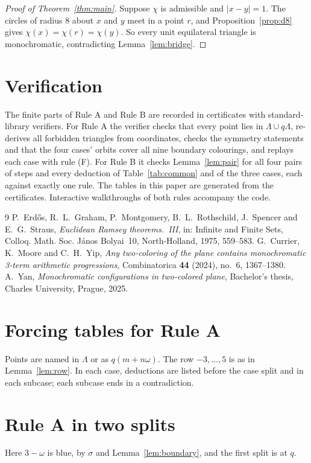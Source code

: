 \documentclass[11pt]{amsart}
\theoremstyle{definition}\newtheorem{definition}[theorem]{Definition}
\theoremstyle{remark}\newtheorem{remark}[theorem]{Remark}
\begin{document}
\begin{proof}[Proof of Theorem~\ref{thm:main}]
Suppose $\chi$ is admissible and $|x-y|=1$. The circles of radius $8$ about $x$ and $y$ meet in a point $r$, and
Proposition~\ref{prop:d8} gives $\chi(x)=\chi(r)=\chi(y)$. So every unit equilateral triangle is monochromatic,
contradicting Lemma~\ref{lem:bridge}.
\end{proof}

\section{Verification}
The finite parts of Rule A and Rule B are recorded in certificates with standard-library verifiers. For Rule A the
verifier checks that every point lies in $\Lambda\cup q\Lambda$, re-derives all forbidden triangles from coordinates,
checks the symmetry statements and that the four cases' orbits cover all nine boundary colourings, and replays each
case with rule (F). For Rule B it checks Lemma~\ref{lem:pair} for all four pairs of steps and every deduction of
Table~\ref{tab:common} and of the three cases, each against exactly one rule. The tables in this
paper are generated from the certificates. Interactive walkthroughs of both rules accompany the code.

\begin{thebibliography}{9}
 P.~Erd\H{o}s, R.~L.~Graham, P.~Montgomery, B.~L.~Rothschild, J.~Spencer and E.~G.~Straus,
\emph{Euclidean Ramsey theorems.~III}, in: Infinite and Finite Sets, Colloq. Math. Soc. J\'anos Bolyai~10,
North-Holland, 1975, 559--583.
 G.~Currier, K.~Moore and C.~H.~Yip, \emph{Any two-coloring of the plane contains monochromatic
3-term arithmetic progressions}, Combinatorica \textbf{44} (2024), no.~6, 1367--1380.
 A.~Yan, \emph{Monochromatic configurations in two-colored plane}, Bachelor's thesis, Charles University,
Prague, 2025.
\end{thebibliography}

\appendix
\section{Forcing tables for Rule A}\label{app:A}
Points are named in $\Lambda$ or as $q(m+n\omega)$. The row $-3,\dots,5$ is as in Lemma~\ref{lem:row}. In each case,
deductions are listed before the case split and in each subcase; each subcase ends in a contradiction.


\section{Rule A in two splits}\label{app:A2}
Here $3-\omega$ is blue, by $\sigma$ and Lemma~\ref{lem:boundary}, and the first split is at $q$.

\end{document}
